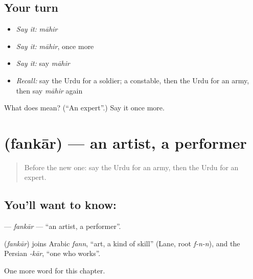 \subsection*{Your turn}
\begin{itemize}
\raggedright
  \item \emph{Say it:} \emph{māhir}
  \item \emph{Say it:} \emph{māhir}, once more
  \item \emph{Say it:} say \emph{māhir}
  \item \emph{Recall:} say the Urdu for a soldier; a constable, then the Urdu for an army, then say \emph{māhir} again
\end{itemize}

\begin{tcolorbox}[breakable,colback=teal!4,colframe=teal!35!black,title={Before you move on}]
What does  mean? (\textquotedblleft{}An expert\textquotedblright{}.) Say it once more.
\end{tcolorbox}
\section[\texorpdfstring{\ur{فنکار} (fankār)}{فنکار (fankār)}]{ (fankār) — an artist, a performer}

\label{lesson:UR-C238-fankar}



\begin{quote}
Before the new one: say the Urdu for an army, then the Urdu for an expert.
\end{quote}

\subsection*{You'll want to know: }
\textbf{} — \emph{fankār} — \textquotedblleft{}an artist, a performer\textquotedblright{}.

\begin{cousinweb}
\textbf{} (\emph{fankār}) joins Arabic \emph{fann}, \textquotedblleft{}art, a kind of skill\textquotedblright{} (Lane, root \emph{f-n-n}), and the Persian \emph{-kār}, \textquotedblleft{}one who works\textquotedblright{}.
\end{cousinweb}

\begin{grammarlens}[title={What you've built}]
One more word for this chapter.
\end{grammarlens}

